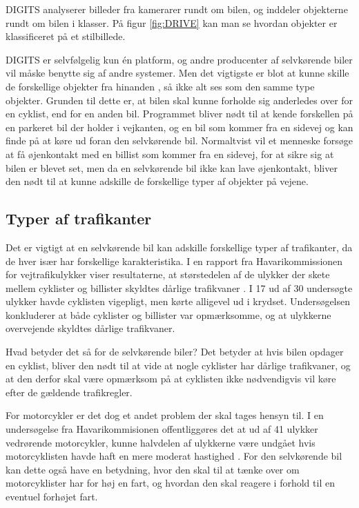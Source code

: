 DIGITS analyserer billeder fra kamerarer rundt om bilen, og inddeler objekterne rundt om bilen i klasser. På figur \ref{fig:DRIVE} kan man se hvordan objekter er klassificeret på et stilbillede.

DIGITS er selvfølgelig kun \'en platform, og andre producenter af selvkørende biler vil måske benytte sig af andre systemer. Men det vigtigste er blot at kunne skille de forskellige objekter fra hinanden \cite{cnet}, så ikke alt ses som den samme type objekter. Grunden til dette er, at bilen skal kunne forholde sig anderledes over for en cyklist, end for en anden bil. Programmet bliver nødt til at kende forskellen på en parkeret bil der holder i vejkanten, og en bil som kommer fra en sidevej og kan finde på at køre ud foran den selvkørende bil. Normaltvist vil et menneske forsøge at få øjenkontakt med en billist som kommer fra en sidevej, for at sikre sig at bilen er blevet set, men da en selvkørende bil ikke kan lave øjenkontakt, bliver den nødt til at kunne adskille de forskellige typer af objekter på vejene.

\subsection{Typer af trafikanter}
Det er vigtigt at en selvkørende bil kan adskille forskellige typer af trafikanter, da de hver især har forskellige karakteristika. I en rapport fra Havarikommissionen for vejtrafikulykker viser resultaterne, at størstedelen af de ulykker der skete mellem cyklister og billister skyldtes dårlige trafikvaner \cite{HVU}. I 17 ud af 30 undersøgte ulykker havde cyklisten vigepligt, men kørte alligevel ud i krydset. Undersøgelsen konkluderer at både cyklister og billister var opmærksomme, og at ulykkerne overvejende skyldtes dårlige trafikvaner. 

Hvad betyder det så for de selvkørende biler? Det betyder at hvis bilen opdager en cyklist, bliver den nødt til at vide at nogle cyklister har dårlige trafikvaner, og at den derfor skal være opmærksom på at cyklisten ikke nødvendigvis vil køre efter de gældende trafikregler. 

For motorcykler er det dog et andet problem der skal tages hensyn til.  I en undersøgelse fra Havarikommisionen offentliggøres det at ud af 41 ulykker vedrørende motorcykler, kunne halvdelen af ulykkerne være undgået hvis motorcyklisten havde haft en mere moderat hastighed \cite{MOT}. For den selvkørende bil kan dette også have en betydning, hvor den skal til at tænke over om motorcyklister har for høj en fart, og hvordan den skal reagere i forhold til en eventuel forhøjet fart.

